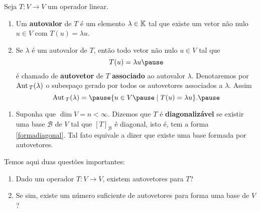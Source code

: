 \documentclass{beamer}
\begin{document}
    \begin{frame}
        \begin{definicao}
            Seja $T : V \to V$ um operador linear.\pause
            \begin{enumerate}[label={\roman*})]
                \item Um \textbf{autovalor} \pause de $T$ é um elemento $\lambda \in \mathbb{K}$ \pause tal que existe um vetor não nulo \pause $u \in V$ \pause com $T(u) = \lambda u$.\pause
                \vspace*{1cm}

                \item Se $\lambda$ é um autovalor de $T$, \pause então todo vetor não nulo \pause $u \in V$ tal que\pause
                \[
                    T(u) = \lambda u\pause
                \]
                é chamado de \textbf{autovetor} \pause de $T$ \textbf{associado} ao autovalor $\lambda$. \pause Denotaremos por ${\rm Aut\,}_T(\lambda)$ \pause o subespaço gerado por todos os autovetores associados a $\lambda$. \pause Assim\pause
                \[
                    \aut_T(\lambda) = \pause \{u \in V \pause \mid T(u) = \lambda u\}.\pause
                \]

                \seti
            \end{enumerate}
        \end{definicao}
    \end{frame}

    \begin{frame}
        \begin{definicao}
            \begin{enumerate}[label={\roman*})]
                \conti
                \item Suponha que $\dim V = n < \infty$. \pause Dizemos que $T$ é \textbf{diagonalizável} \pause se existir uma base $\mathcal{B}$ de $V$ \pause tal que $[T]_\mathcal{B}$ é diagonal, \pause isto é, tem a forma \eqref{formadiagonal}. \pause Tal fato equivale a dizer que existe uma base formada por autovetores.
        \end{enumerate}
    \end{definicao}
    \end{frame}

    \begin{frame}
        Temos aqui duas questões importantes:\pause
        \vspace*{.5cm}
        \begin{enumerate}[label={\arabic*})]
            \item Dado um operador $T \colon V \to V$, \pause existem autovetores para $T$?\pause
            \vspace*{2cm}

            \item Se sim, \pause existe um número suficiente de autovetores \pause para forma uma base de $V$?
        \end{enumerate}
    \end{frame}
\end{document}
